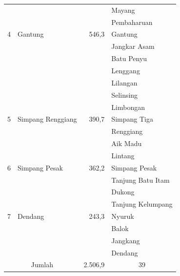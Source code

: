 \begin{longtable}[H]{rlrl}
                   &                   &         & Mayang                 \\
                   &                   &         & Pembaharuan            \\ \midrule
                 4 & Gantung           & 546,3   & Gantung                \\
                   &                   &         & Jangkar Asam           \\
                   &                   &         & Batu Penyu             \\
                   &                   &         & Lenggang               \\
                   &                   &         & Lilangan               \\
                   &                   &         & Selinsing              \\
                   &                   &         & Limbongan              \\ \midrule
                 5 & Simpang Renggiang & 390,7   & Simpang Tiga           \\
                   &                   &         & Renggiang              \\
                   &                   &         & Aik Madu               \\
                   &                   &         & Lintang                \\ \midrule
                 6 & Simpang Pesak     & 362,2   & Simpang Pesak          \\
                   &                   &         & Tanjung Batu Itam      \\
                   &                   &         & Dukong                 \\
                   &                   &         & Tanjung Kelumpang      \\ \midrule
                 7 & Dendang           & 243,3   & Nyuruk                 \\
                   &                   &         & Balok                  \\
                   &                   &         & Jangkang               \\
                   &                   &         & Dendang                \\ \midrule
\multicolumn{2}{c}{Jumlah}             & 2.506,9 & \multicolumn{1}{c}{39}\\ %
\bottomrule
\end{longtable}

